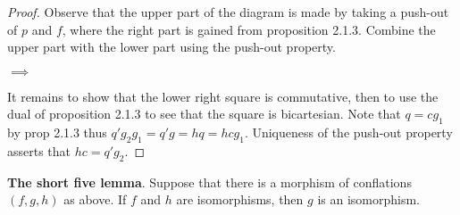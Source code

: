     \begin{proof}
        Observe that the upper part of the diagram is made by taking a push-out of $p$ and $f$, where the right part is gained from proposition 2.1.3. Combine the upper part with the lower part using the push-out property.
        \begin{center}
             $\implies$
        \end{center}
        It remains to show that the lower right square is commutative, then to use the dual of proposition 2.1.3 to see that the square is bicartesian. Note that $q=cg_1$ by prop 2.1.3 thus $q'g_2g_1=q'g=hq=hcg_1$. Uniqueness of the push-out property asserts that $hc=q'g_2$.
    \end{proof}

    \begin{corollary}
        \textbf{The short five lemma}. Suppose that there is a morphism of conflations $(f,g,h)$ as above. If $f$ and $h$ are isomorphisms, then $g$ is an isomorphism.
    \end{corollary}


